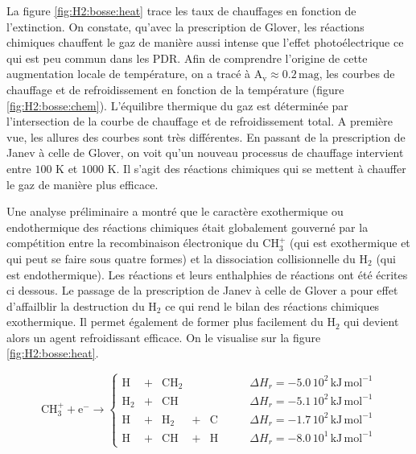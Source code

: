 La figure \ref{fig:H2:bosse:heat} trace les taux de chauffages en fonction de l'extinction. On constate, qu'avec la prescription de Glover, les réactions chimiques chauffent le gaz de manière aussi intense que l'effet photoélectrique ce qui est peu commun dans les PDR. Afin de comprendre l'origine de cette augmentation locale de température, on a tracé à $\mathrm{A}_\mathrm{v} \approx 0.2 \,\mathrm{mag}$, les courbes de chauffage et de refroidissement en fonction de la température (figure \ref{fig:H2:bosse:chem}). L'équilibre thermique du gaz est déterminée par l'intersection de la courbe de chauffage et de refroidissement total. A première vue, les allures des courbes sont très différentes. En passant de la prescription de Janev à celle de Glover, on voit qu'un nouveau processus de chauffage intervient entre $100$ K et $1000$ K. Il s'agit des réactions chimiques qui se mettent à chauffer le gaz de manière plus efficace. \newline

Une analyse préliminaire a montré que le caractère exothermique ou endothermique des réactions chimiques était globalement gouverné par la compétition entre la recombinaison électronique du $\mathrm{CH}_3^+$ (qui est exothermique et qui peut se faire sous quatre formes) et la dissociation collisionnelle du $\mathrm{H}_2$ (qui est endothermique). Les réactions et leurs enthalphies de réactions ont été écrites ci dessous. Le passage de la prescription de Janev à celle de Glover a pour effet d'affailblir la destruction du $\mathrm{H}_2$ ce qui rend le bilan des réactions chimiques exothermique. Il permet également de former plus facilement du $\mathrm{H}_2$ qui devient alors un agent refroidissant efficace. On le visualise sur la figure \ref{fig:H2:bosse:heat}. \newline


\begin{equation}
     \mathrm{CH}_3^+ +  \mathrm{e}^- \rightarrow \left\{ 
    \begin{array}{lcccclr}
         \mathrm{H} &+& \mathrm{CH}_2  & & & \qquad \Delta H_r = - 5.0\,10^2 \,\mathrm{kJ}\,\mathrm{mol}^{-1}\\
         \mathrm{H}_2 &+& \mathrm{CH}  & & & \qquad \Delta H_r = - 5.1\,10^2 \,\mathrm{kJ}\,\mathrm{mol}^{-1}\\
         \mathrm{H} &+& \mathrm{H}_2 &+& \mathrm{C}  & \qquad \Delta H_r = - 1.7\,10^2 \,\mathrm{kJ}\,\mathrm{mol}^{-1}\\
         \mathrm{H} &+& \mathrm{CH} &+& \mathrm{H} & \qquad  \Delta H_r = - 8.0\,10^1 \,\mathrm{kJ}\,\mathrm{mol}^{-1}
    \end{array}\right.
\end{equation}


